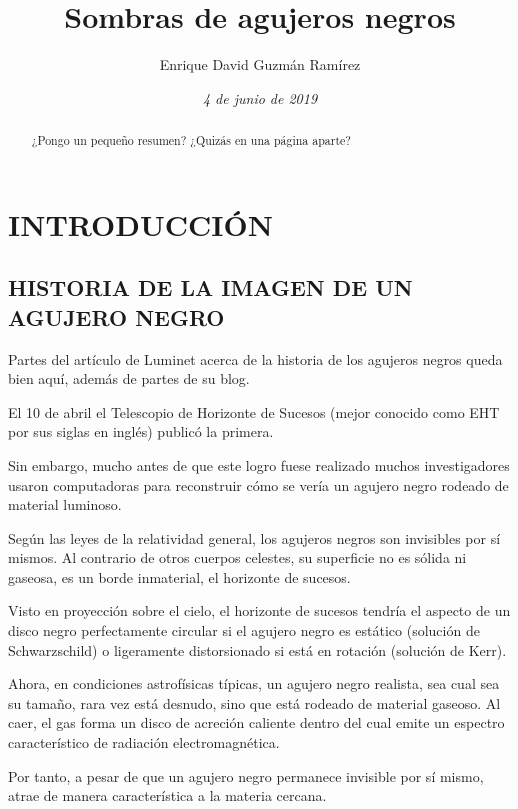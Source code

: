 \documentclass[10pt]{article}
\title{\textbf{{\Large Sombras de agujeros negros}}}
\author{Enrique David Guzmán Ramírez \vspace{-1em}}
\affil{Facultad de Ciencias, Universidad Nacional Autónoma de México \vspace{-0.5em}}
\date{\textit{{\normalsize 4 de junio de 2019}}}
\begin{document}
	
	
\maketitle
	
\vspace{-2em}
\begin{abstract}
\vspace{-1em}
¿Pongo un pequeño resumen? ¿Quizás en una página aparte?
\end{abstract}
	

\section{INTRODUCCIÓN}

\subsection{HISTORIA DE LA IMAGEN DE UN AGUJERO NEGRO}

Partes del artículo de Luminet acerca de la historia de los agujeros negros queda bien aquí, además de partes de su blog. 

El 10 de abril el Telescopio de Horizonte de Sucesos (mejor conocido como EHT por sus siglas en inglés) publicó la primera. \bigskip

Sin embargo, mucho antes de que este logro fuese realizado muchos investigadores usaron computadoras para reconstruir cómo se vería un agujero negro rodeado de material luminoso. \bigskip

Según las leyes de la relatividad general, los agujeros negros son invisibles por sí mismos. Al contrario de otros cuerpos celestes, su superficie no es sólida ni gaseosa, es un borde inmaterial, el horizonte de sucesos.

Visto en proyección sobre el cielo, el horizonte de sucesos tendría el aspecto de un disco negro perfectamente circular si el agujero negro es estático (solución de Schwarzschild) o ligeramente distorsionado si está en rotación (solución de Kerr).

Ahora, en condiciones astrofísicas típicas, un agujero negro realista, sea cual sea su tamaño, rara vez está desnudo, sino que está rodeado de material gaseoso. Al caer, el gas forma un disco de acreción caliente dentro del cual emite un espectro característico de radiación electromagnética.

Por tanto, a pesar de que un agujero negro permanece invisible por sí mismo, atrae de manera característica a la materia cercana.
\end{document}
